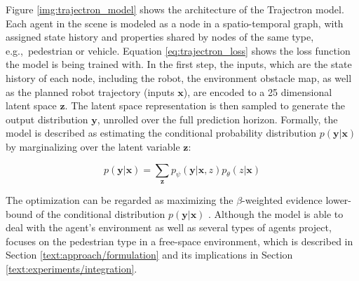 Figure \ref{img:trajectron_model} shows the architecture of the Trajectron model. Each agent in the scene is modeled as a node in a spatio-temporal graph, with assigned state history and properties shared by nodes of the same type, e.g.,\ pedestrian or vehicle. Equation \ref{eq:trajectron_loss} shows the loss function the model is being trained with. In the first step, the inputs, which are the state history of each node, including the robot, the environment obstacle map, as well as the planned robot trajectory (inputs $\boldsymbol{x}$), are encoded to a 25 dimensional latent space $\boldsymbol{z}$. The latent space representation is then sampled to generate the output distribution $\boldsymbol{y}$, unrolled over the full prediction horizon. Formally, the model is described as estimating the conditional probability distribution $p(\boldsymbol{y}|\boldsymbol{x})$ by marginalizing over the latent variable $\boldsymbol{z}$:

\begin{equation}
p(\boldsymbol{y}|\boldsymbol{x}) = \sum_{\boldsymbol{z}} p_{\psi} (\boldsymbol{y} | \boldsymbol{x}, z) p_{\theta}(z | \boldsymbol{x})
\end{equation}

The optimization can be regarded as maximizing the $\beta$-weighted evidence lower-bound of the conditional distribution $p(\boldsymbol{y}|\boldsymbol{x})$ \cite{Ivanovic2018}. Although the model is able to deal with the agent's environment as well as several types of agents project, \project focuses on the pedestrian type in a free-space environment, which is described in Section \ref{text:approach/formulation} and its implications in Section \ref{text:experiments/integration}.

